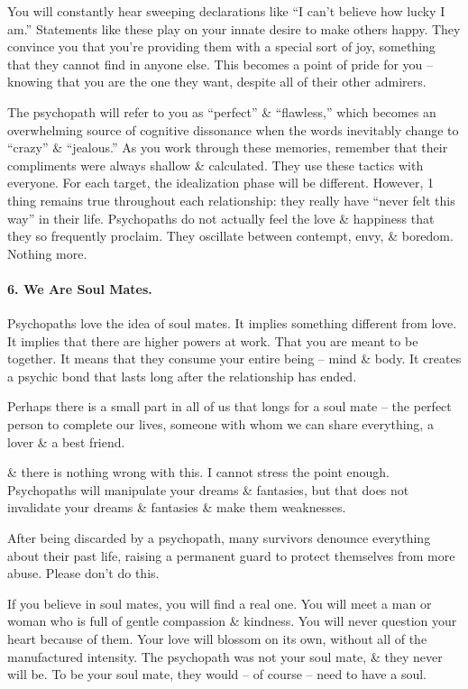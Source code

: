 \documentclass{article}
\numberwithin{equation}{section}
\begin{document}
You will constantly hear sweeping declarations like ``I can't believe how lucky I am.'' Statements like these play on your innate desire to make others happy. They convince you that you're providing them with a special sort of joy, something that they cannot find in anyone else. This becomes a point of pride for you -- knowing that you are the one they want, despite all of their other admirers.

The psychopath will refer to you as ``perfect'' \& ``flawless,'' which becomes an overwhelming source of cognitive dissonance when the words inevitably change to ``crazy'' \& ``jealous.'' As you work through these memories, remember that their compliments were always shallow \& calculated. They use these tactics with everyone. For each target, the idealization phase will be different. However, 1 thing remains true throughout each relationship: they really have ``never felt this way'' in their life. Psychopaths do not actually feel the love \& happiness that they so frequently proclaim. They oscillate between contempt, envy, \& boredom. Nothing more.

\paragraph{6. We Are Soul Mates.} Psychopaths love the idea of soul mates. It implies something different from love. It implies that there are higher powers at work. That you are meant to be together. It means that they consume your entire being -- mind \& body. It creates a psychic bond that lasts long after the relationship has ended.

Perhaps there is a small part in all of us that longs for a soul mate -- the perfect person to complete our lives, someone with whom we can share everything, a lover \& a best friend.

\& there is nothing wrong with this. I cannot stress the point enough. Psychopaths will manipulate your dreams \& fantasies, but that does not invalidate your dreams \& fantasies \& make them weaknesses.

After being discarded by a psychopath, many survivors denounce everything about their past life, raising a permanent guard to protect themselves from more abuse. Please don't do this.

If you believe in soul mates, you will find a real one. You will meet a man or woman who is full of gentle compassion \& kindness. You will never question your heart because of them. Your love will blossom on its own, without all of the manufactured intensity. The psychopath was not your soul mate, \& they never will be. To be your soul mate, they would -- of course -- need to have a soul.
\end{document}
